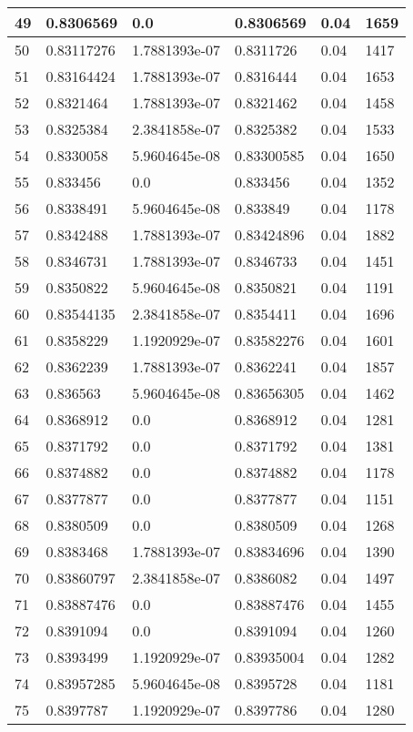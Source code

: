 \begin{longtable}{|l|l|l|l|l|l|}
49 & 0.8306569 & 0.0 & 0.8306569 & 0.04 & 1659 \\ \hline 
50 & 0.83117276 & 1.7881393e-07 & 0.8311726 & 0.04 & 1417 \\ \hline 
51 & 0.83164424 & 1.7881393e-07 & 0.8316444 & 0.04 & 1653 \\ \hline 
52 & 0.8321464 & 1.7881393e-07 & 0.8321462 & 0.04 & 1458 \\ \hline 
53 & 0.8325384 & 2.3841858e-07 & 0.8325382 & 0.04 & 1533 \\ \hline 
54 & 0.8330058 & 5.9604645e-08 & 0.83300585 & 0.04 & 1650 \\ \hline 
55 & 0.833456 & 0.0 & 0.833456 & 0.04 & 1352 \\ \hline 
56 & 0.8338491 & 5.9604645e-08 & 0.833849 & 0.04 & 1178 \\ \hline 
57 & 0.8342488 & 1.7881393e-07 & 0.83424896 & 0.04 & 1882 \\ \hline 
58 & 0.8346731 & 1.7881393e-07 & 0.8346733 & 0.04 & 1451 \\ \hline 
59 & 0.8350822 & 5.9604645e-08 & 0.8350821 & 0.04 & 1191 \\ \hline 
60 & 0.83544135 & 2.3841858e-07 & 0.8354411 & 0.04 & 1696 \\ \hline 
61 & 0.8358229 & 1.1920929e-07 & 0.83582276 & 0.04 & 1601 \\ \hline 
62 & 0.8362239 & 1.7881393e-07 & 0.8362241 & 0.04 & 1857 \\ \hline 
63 & 0.836563 & 5.9604645e-08 & 0.83656305 & 0.04 & 1462 \\ \hline 
64 & 0.8368912 & 0.0 & 0.8368912 & 0.04 & 1281 \\ \hline 
65 & 0.8371792 & 0.0 & 0.8371792 & 0.04 & 1381 \\ \hline 
66 & 0.8374882 & 0.0 & 0.8374882 & 0.04 & 1178 \\ \hline 
67 & 0.8377877 & 0.0 & 0.8377877 & 0.04 & 1151 \\ \hline 
68 & 0.8380509 & 0.0 & 0.8380509 & 0.04 & 1268 \\ \hline 
69 & 0.8383468 & 1.7881393e-07 & 0.83834696 & 0.04 & 1390 \\ \hline 
70 & 0.83860797 & 2.3841858e-07 & 0.8386082 & 0.04 & 1497 \\ \hline 
71 & 0.83887476 & 0.0 & 0.83887476 & 0.04 & 1455 \\ \hline 
72 & 0.8391094 & 0.0 & 0.8391094 & 0.04 & 1260 \\ \hline 
73 & 0.8393499 & 1.1920929e-07 & 0.83935004 & 0.04 & 1282 \\ \hline 
74 & 0.83957285 & 5.9604645e-08 & 0.8395728 & 0.04 & 1181 \\ \hline 
75 & 0.8397787 & 1.1920929e-07 & 0.8397786 & 0.04 & 1280 \\ \hline 
\end{longtable}